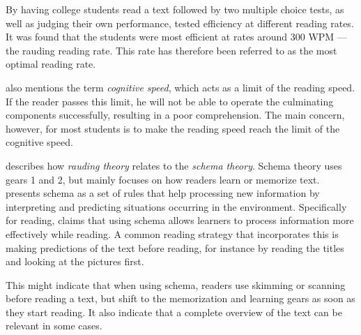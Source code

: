 By having college students read a text followed by two multiple choice tests, as well as judging their own performance, \citeauthor{carver_reading_1992} tested efficiency at different reading rates. It was found that the students were most efficient at rates around 300 WPM --- the rauding reading rate. This rate has therefore been referred to as the most optimal reading rate.

\citeauthor{carver_reading_1992} also mentions the term \textit{cognitive speed}, which acts as a limit of the reading speed. If the reader passes this limit, he will not be able to operate the culminating components successfully, resulting in a poor comprehension. The main concern, however, for most students is to make the reading speed reach the limit of the cognitive speed.

\citeauthor{carver_reading_1992} describes how \textit{rauding theory} relates to the \textit{schema theory}. Schema theory uses gears 1 and 2, but mainly focuses on how readers learn or memorize text.  presents schema as a set of rules that help processing new information by interpreting and predicting situations occurring in the environment. Specifically for reading, \citeauthor{widmayer_schema_2005} claims that using schema allows learners to process information more effectively while reading. A common reading strategy that incorporates this is making predictions of the text before reading, for instance by reading the titles and looking at the pictures first.

This might indicate that when using schema, readers use skimming or scanning before reading a text, but shift to the memorization and learning gears as soon as they start reading. It also indicate that a complete overview of the text can be relevant in some cases.


